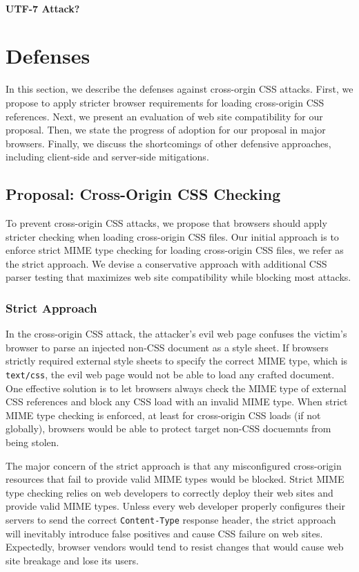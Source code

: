 \documentclass{acm_proc_article-sp}
\begin{document}
\paragraph{UTF-7 Attack?}


\section{Defenses}
In this section, we describe the defenses against cross-orgin CSS attacks. First, we propose to apply stricter browser requirements for loading cross-origin CSS references. Next, we present an evaluation of web site compatibility for our proposal. Then, we state the progress of adoption for our proposal in major browsers. Finally, we discuss the shortcomings of other defensive approaches, including client-side and server-side mitigations.

\subsection{Proposal: Cross-Origin CSS Checking}
To prevent cross-origin CSS attacks, we propose that browsers should apply stricter checking when loading cross-origin CSS files. Our initial approach is to enforce strict MIME type checking for loading cross-origin CSS files, we refer as the strict approach. We devise a conservative approach with additional CSS parser testing that maximizes web site compatibility while blocking most attacks.

\subsubsection{Strict Approach}
In the cross-origin CSS attack, the attacker's evil web page confuses the victim's browser to parse an injected non-CSS document as a style sheet. If browsers strictly required external style sheets to specify the correct MIME type, which is \texttt{text/css}, the evil web page would not be able to load any crafted document. One effective solution is to let browsers always check the MIME type of external CSS references and block any CSS load with an invalid MIME type. When strict MIME type checking is enforced, at least for cross-origin CSS loads (if not globally), browsers would be able to protect target non-CSS docuemnts from being stolen.

The major concern of the strict approach is that any misconfigured cross-origin resources that fail to provide valid MIME types would be blocked. Strict MIME type checking relies on web developers to correctly deploy their web sites and provide valid MIME types. Unless every web developer properly configures their servers to send the correct \texttt{Content-Type} response header, the strict approach will inevitably introduce false positives and cause CSS failure on web sites. Expectedly, browser vendors would tend to resist changes that would cause web site breakage and lose its users.
\end{document}
